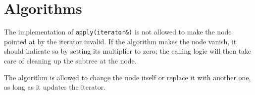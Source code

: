 \section{Algorithms}

The implementation of \verb|apply(iterator&)| is not allowed to make
the node pointed at by the iterator invalid. If the algorithm makes
the node vanish, it should indicate so by setting its multiplier to
zero; the calling logic will then take care of cleaning up the subtree
at the node.

The algorithm is allowed to change the node itself or replace it with
another one, as long as it updates the iterator.

